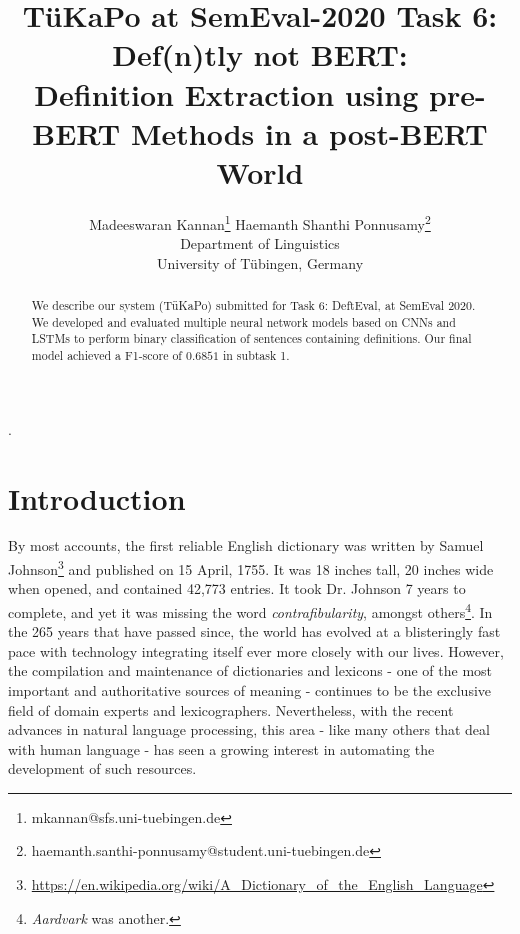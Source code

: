 \documentclass[11pt]{article}
\title{T\"uKaPo at SemEval-2020 Task 6: Def(n)tly not BERT:\\
Definition Extraction using pre-BERT Methods in a post-BERT World}
\author{Madeeswaran Kannan\thanks{\quad mkannan@sfs.uni-tuebingen.de} \qquad Haemanth Shanthi Ponnusamy\thanks{\quad haemanth.santhi-ponnusamy@student.uni-tuebingen.de}\\
	Department of Linguistics \\
	University of T\"ubingen, Germany \\}
\date{}
\begin{document}
\setlength{\parindent}{0pt}.

\maketitle
\begin{abstract}
  We describe our system (T\"{u}KaPo) submitted for Task 6: DeftEval, at SemEval 2020.
  We developed and evaluated multiple neural network models based on CNNs and LSTMs to
  perform binary classification of sentences containing definitions. Our final model
  achieved a F1-score of $0.6851$ in subtask 1.
\end{abstract}

\renewcommand*{\arraystretch}{1.0}


\section{Introduction}
By most accounts, the first reliable English dictionary was written by Samuel Johnson\footnote{\url{https://en.wikipedia.org/wiki/A_Dictionary_of_the_English_Language}} and published on 15 April, 1755. It was 18 inches tall, 20 inches wide when opened, and
contained 42,773 entries. It took Dr. Johnson 7 years to complete, and yet it was missing the word \emph{contrafibularity}, amongst others\footnote{\emph{Aardvark} was another.}. In the 265 years that have passed since, the world has evolved at a blisteringly fast
pace with technology integrating itself ever more closely with our lives. However, the compilation and maintenance of dictionaries and
lexicons - one of the most important and authoritative sources of meaning - continues to be the exclusive field of domain experts
and lexicographers. Nevertheless, with the recent advances in natural language processing, this area - like many others that deal
with human language - has seen a growing interest in automating the development of such resources.\\
\end{document}
